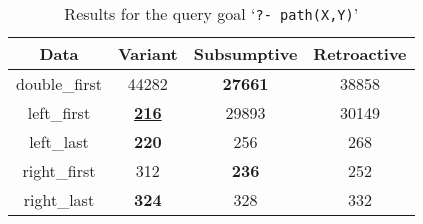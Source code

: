 \begin{table}[ht]
\centering
\footnotesize{
  \begin{tabular}{c|ccc}
   \hline
    \hline
    \multicolumn{1}{c|}{\small{\textbf{Data}}} & \textbf{\small{Variant}} & \textbf{\small{Subsumptive}} & \textbf{\small{Retroactive}} \\
   \hline
   \hline

double\_first &  44282  &  \textbf{27661}  &  38858 \\
left\_first &  \underline{\textbf{216}}  &  29893  &  30149 \\
left\_last &  \textbf{220}  &  256  &  268 \\
right\_first &  312  &  \textbf{236}  &  252 \\
right\_last &  \textbf{324}  &  328  &  332 \\
\hline
\hline
\end{tabular}
}
\caption{Results for the query goal `\texttt{?-~path(X,Y)}'}
\label{tbl:results_path_xy}
\end{table}